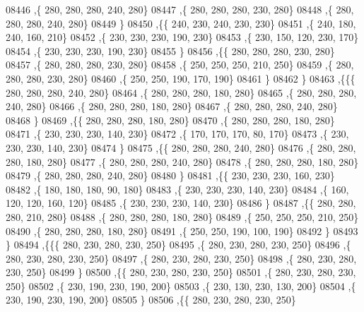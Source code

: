 \begin{DoxyCode}
08446     ,\{   280,   280,   280,   240,   280\}
08447     ,\{   280,   280,   280,   230,   280\}
08448     ,\{   280,   280,   280,   240,   280\}
08449     \}
08450    ,\{\{   240,   230,   240,   230,   230\}
08451     ,\{   240,   180,   240,   160,   210\}
08452     ,\{   230,   230,   230,   190,   230\}
08453     ,\{   230,   150,   120,   230,   170\}
08454     ,\{   230,   230,   230,   190,   230\}
08455     \}
08456    ,\{\{   280,   280,   280,   230,   280\}
08457     ,\{   280,   280,   280,   230,   280\}
08458     ,\{   250,   250,   250,   210,   250\}
08459     ,\{   280,   280,   280,   230,   280\}
08460     ,\{   250,   250,   190,   170,   190\}
08461     \}
08462    \}
08463   ,\{\{\{   280,   280,   280,   240,   280\}
08464     ,\{   280,   280,   280,   180,   280\}
08465     ,\{   280,   280,   280,   240,   280\}
08466     ,\{   280,   280,   280,   180,   280\}
08467     ,\{   280,   280,   280,   240,   280\}
08468     \}
08469    ,\{\{   280,   280,   280,   180,   280\}
08470     ,\{   280,   280,   280,   180,   280\}
08471     ,\{   230,   230,   230,   140,   230\}
08472     ,\{   170,   170,   170,    80,   170\}
08473     ,\{   230,   230,   230,   140,   230\}
08474     \}
08475    ,\{\{   280,   280,   280,   240,   280\}
08476     ,\{   280,   280,   280,   180,   280\}
08477     ,\{   280,   280,   280,   240,   280\}
08478     ,\{   280,   280,   280,   180,   280\}
08479     ,\{   280,   280,   280,   240,   280\}
08480     \}
08481    ,\{\{   230,   230,   230,   160,   230\}
08482     ,\{   180,   180,   180,    90,   180\}
08483     ,\{   230,   230,   230,   140,   230\}
08484     ,\{   160,   120,   120,   160,   120\}
08485     ,\{   230,   230,   230,   140,   230\}
08486     \}
08487    ,\{\{   280,   280,   280,   210,   280\}
08488     ,\{   280,   280,   280,   180,   280\}
08489     ,\{   250,   250,   250,   210,   250\}
08490     ,\{   280,   280,   280,   180,   280\}
08491     ,\{   250,   250,   190,   100,   190\}
08492     \}
08493    \}
08494   ,\{\{\{   280,   230,   280,   230,   250\}
08495     ,\{   280,   230,   280,   230,   250\}
08496     ,\{   280,   230,   280,   230,   250\}
08497     ,\{   280,   230,   280,   230,   250\}
08498     ,\{   280,   230,   280,   230,   250\}
08499     \}
08500    ,\{\{   280,   230,   280,   230,   250\}
08501     ,\{   280,   230,   280,   230,   250\}
08502     ,\{   230,   190,   230,   190,   200\}
08503     ,\{   230,   130,   230,   130,   200\}
08504     ,\{   230,   190,   230,   190,   200\}
08505     \}
08506    ,\{\{   280,   230,   280,   230,   250\}

\end{DoxyCode}
